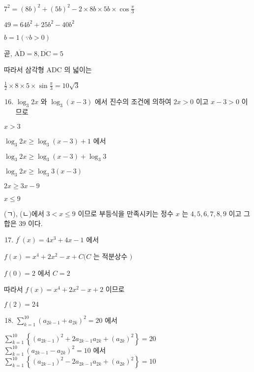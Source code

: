 \documentclass[10pt]{article}
\begin{document}
\(7^{2}=(8 b)^{2}+(5 b)^{2}-2 \times 8 b \times 5 b \times \cos \frac{\pi}{3}\)

\(49=64 b^{2}+25 b^{2}-40 b^{2}\)

\(b=1(\because b>0)\)

곧, \(\overline{\mathrm{AD}}=8, \overline{\mathrm{DC}}=5\)

따라서 삼각형 ADC 의 넓이는

\(\frac{1}{2} \times 8 \times 5 \times \sin \frac{\pi}{3}=10 \sqrt{3}\)

\begin{enumerate}
  \setcounter{enumi}{15}
  \item \(\log _{3} 2 x\) 와 \(\log _{3}(x-3)\) 에서 진수의 조건에 의하여 \(2 x>0\) 이고 \(x-3>0\) 이므로
\end{enumerate}

\(x>3\)

\(\log _{3} 2 x \geq \log _{3}(x-3)+1\) 에서

\(\log _{3} 2 x \geq \log _{3}(x-3)+\log _{3} 3\)

\(\log _{3} 2 x \geq \log _{3} 3(x-3)\)

\(2 x \geq 3 x-9\)

\(x \leq 9\)

(ㄱ), (ㄴ)에서 \(3<x \leq 9\) 이므로 부등식을 만족시키는 정수 \(x\) 는 \(4,5,6,7,8,9\) 이고 그 합은 39 이다.

\begin{enumerate}
  \setcounter{enumi}{16}
  \item \(f^{\prime}(x)=4 x^{3}+4 x-1\) 에서
\end{enumerate}

\(f(x)=x^{4}+2 x^{2}-x+C(C\) 는 적분상수 \()\)

\(f(0)=2\) 에서 \(C=2\)

따라서 \(f(x)=x^{4}+2 x^{2}-x+2\) 이므로

\(f(2)=24\)

\begin{enumerate}
  \setcounter{enumi}{17}
  \item \(\sum_{k=1}^{10}\left(a_{2 k-1}+a_{2 k}\right)^{2}=20\) 에서
\end{enumerate}

\(\sum_{k=1}^{10}\left\{\left(a_{2 k-1}\right)^{2}+2 a_{2 k-1} a_{2 k}+\left(a_{2 k}\right)^{2}\right\}=20\)\\
\(\sum_{k=1}^{10}\left(a_{2 k-1}-a_{2 k}\right)^{2}=10\) 에서\\
\(\sum_{k=1}^{10}\left\{\left(a_{2 k-1}\right)^{2}-2 a_{2 k-1} a_{2 k}+\left(a_{2 k}\right)^{2}\right\}=10\)
\end{document}
